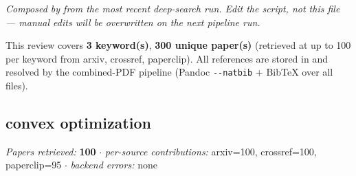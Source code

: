 \documentclass[
]{article}
\newcounter{none} %
\begin{document}
\emph{Composed by 
from the most recent deep-search run. Edit the script, not this file ---
manual edits will be overwritten on the next pipeline run.}

This review covers \textbf{3 keyword(s)}, \textbf{300 unique paper(s)}
(retrieved at up to 100 per keyword from arxiv, crossref, paperclip).
All references are stored in 
and resolved by the combined-PDF pipeline (Pandoc \texttt{-\/-natbib} +
BibTeX over all  files).

\subsection{convex optimization}\label{convex-optimization}

\emph{Papers retrieved:} \textbf{100} \texorpdfstring{\ensuremath{\cdot}}{.} \emph{per-source contributions:}
arxiv=100, crossref=100, paperclip=95 \texorpdfstring{\ensuremath{\cdot}}{.} \emph{backend errors:} none
\end{document}
